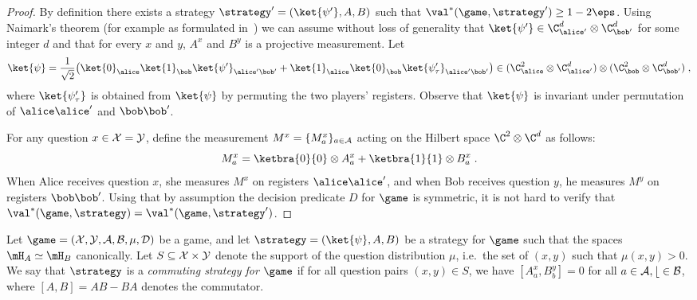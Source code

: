 \begin{proof}
  By definition there exists a strategy $\strategy'= (\ket{\psi'},A,B)$ such
  that $\val^*(\game,\strategy')\geq 1-2\eps$.
Using Naimark's theorem (for example as formulated in~\cite[Theorem 4.2]{NW19}) we can assume
without loss of generality that $\ket{\psi'}\in\C_{\alice'}^d\otimes \C_{\bob'}^d$ for some integer $d$
  and that for every $x$ and $y$, $A^x$ and $B^y$ is a projective measurement.
  Let
  \[
    \ket{\psi} = \frac{1}{\sqrt{2}} \big( \ket{0}_\alice \ket{1}_\bob
    \ket{\psi'}_{\alice'\bob'} + \ket{1}_\alice \ket{0}_\bob
    \ket{\psi'_\tau}_{\alice'\bob'}\big) \in (\C_{\alice}^2 \otimes
    \C_{\alice'}^d) \otimes (\C_\bob^2 \otimes \C_{\bob'}^d)\;,
  \]
  where $\ket{\psi'_\tau}$ is obtained from $\ket{\psi}$ by permuting the two
  players' registers.
  Observe that $\ket{\psi}$ is invariant under permutation of $\alice\alice'$
  and $\bob\bob'$.
  
  For any question $x\in \cal{X}=\cal{Y}$, define the measurement $M^x = \{M^x_a\}_{a \in \cal{A}}$
  acting on the Hilbert space $\C^2 \otimes \C^d$ as follows:
  \[
  	M^x_a = \ketbra{0}{0} \otimes A^x_a + \ketbra{1}{1} \otimes B^x_a \;.
  \]
  When Alice receives question $x$, she measures $M^x$ on registers $\alice \alice'$, and when Bob receives 
  question $y$, he measures $M^y$ on registers $\bob \bob'$.
  Using that by assumption the decision predicate $D$ for $\game$ is symmetric,
  it is not hard to verify that $\val^*(\game,\strategy) =
  \val^*(\game,\strategy')$.
\end{proof}

\begin{definition}
\hypertarget{000E}{}
\reversemarginpar{}
  \label{def:comm-strategy}
  Let $\game = (\cal{X}, \cal{Y}, \cal{A}, \cal{B}, \mu, D)$ be a game, and let
  $\strategy = (\ket{\psi}, A, B)$ be a strategy for $\game$ such that the
  spaces $\mH_A \simeq \mH_B$ canonically.
  Let $S \subseteq \cal{X} \times \cal{Y}$ denote the support of the question
  distribution $\mu$, i.e.\ the set of $(x,y)$ such that $\mu(x,y)>0$.
  We say that $\strategy$ is a \emph{commuting strategy for $\game$} if for all
  question pairs $(x, y) \in S$, we have $[A^x_a, B^y_b] = 0$ 
  for all $a
  \in \cal{A}, b \in \cal{B}$, where $[A, B] = AB - BA$ denotes the commutator.
\end{definition}

